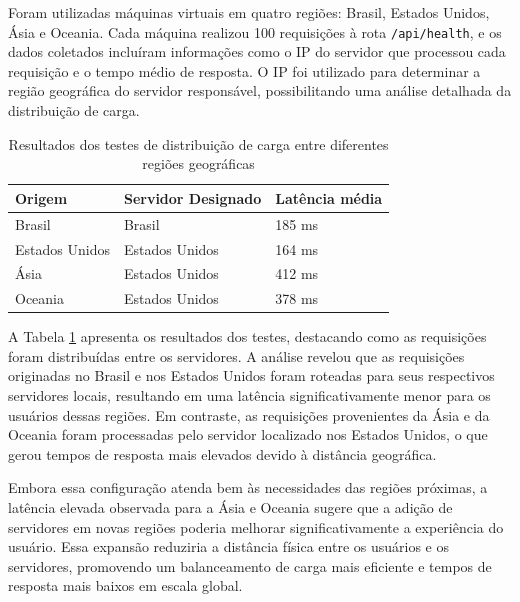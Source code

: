 Foram utilizadas máquinas virtuais em quatro regiões: Brasil, Estados Unidos, Ásia e Oceania. Cada máquina realizou 100 requisições à rota \texttt{/api/health}, e os dados coletados incluíram informações como o IP do servidor que processou cada requisição e o tempo médio de resposta. O IP foi utilizado para determinar a região geográfica do servidor responsável, possibilitando uma análise detalhada da distribuição de carga.

\begin{table}[H]
    \centering
    \caption{Resultados dos testes de distribuição de carga entre diferentes regiões geográficas}
    \label{tab:geo-distribution}
    \begin{tabular}{|l|l|l|}
        \hline
        \textbf{Origem}   & \textbf{Servidor Designado} & \textbf{Latência média} \\ \hline
        Brasil         & Brasil                      & 185 ms                  \\ \hline
        Estados Unidos & Estados Unidos              & 164 ms                  \\ \hline
        Ásia           & Estados Unidos              & 412 ms                  \\ \hline
        Oceania        & Estados Unidos              & 378 ms                  \\ \hline
    \end{tabular}
\end{table}

A Tabela \ref{tab:geo-distribution} apresenta os resultados dos testes, destacando como as requisições foram distribuídas entre os servidores. A análise revelou que as requisições originadas no Brasil e nos Estados Unidos foram roteadas para seus respectivos servidores locais, resultando em uma latência significativamente menor para os usuários dessas regiões. Em contraste, as requisições provenientes da Ásia e da Oceania foram processadas pelo servidor localizado nos Estados Unidos, o que gerou tempos de resposta mais elevados devido à distância geográfica.

Embora essa configuração atenda bem às necessidades das regiões próximas, a latência elevada observada para a Ásia e Oceania sugere que a adição de servidores em novas regiões poderia melhorar significativamente a experiência do usuário. Essa expansão reduziria a distância física entre os usuários e os servidores, promovendo um balanceamento de carga mais eficiente e tempos de resposta mais baixos em escala global.


